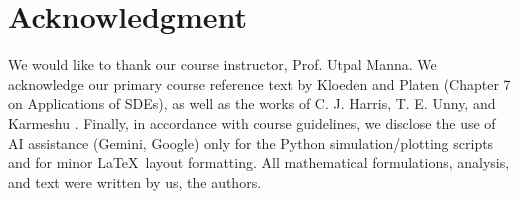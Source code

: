 \documentclass[conference]{IEEEtran}
\renewcommand{\bigskip}{\vspace{2\baselineskip}}
\theoremstyle{definitionsc}
\theoremstyle{plainsc}
\theoremstyle{remarksc}
\begin{document}
\bigskip



\section*{Acknowledgment}

We would like to thank our course instructor, Prof. Utpal Manna. We acknowledge our primary course reference text by Kloeden and Platen \cite{kloedenplaten} (Chapter 7 on Applications of SDEs), as well as the works of C. J. Harris, T. E. Unny, and Karmeshu \cite{cjharris, unny_karmeshu}. Finally, in accordance with course guidelines, we disclose the use of AI assistance (Gemini, Google) only for the Python simulation/plotting scripts and for minor \LaTeX\ layout formatting. All mathematical formulations, analysis, and text were written by us, the authors.

\bigskip





\end{document}

